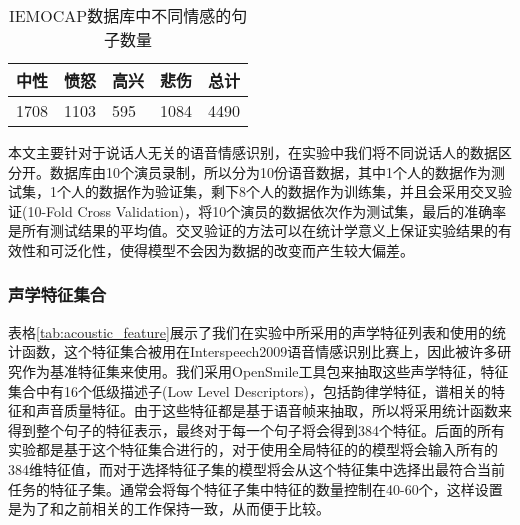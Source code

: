 \begin{table}[htb]
\centering
\begin{minipage}[t]{0.8\linewidth} %
\caption{IEMOCAP数据库中不同情感的句子数量}
\label{tab:emo_sample_num}
    \begin{tabularx}{\linewidth}{X<{\centering} X<{\centering} X<{\centering} X<{\centering} X<{\centering}}
        \toprule[1.5pt]
        中性 & 愤怒 & 高兴 & 悲伤 & 总计 \\
        \midrule[1pt]
        1708 & 1103 & 595 & 1084 & 4490 \\
        \bottomrule[1.5pt]
    \end{tabularx}
\end{minipage}
\end{table}

本文主要针对于说话人无关的语音情感识别，在实验中我们将不同说话人的数据区分开。数据库由10个演员录制，所以分为10份语音数据，其中1个人的数据作为测试集，1个人的数据作为验证集，剩下8个人的数据作为训练集，并且会采用交叉验证(10-Fold Cross Validation)，将10个演员的数据依次作为测试集，最后的准确率是所有测试结果的平均值。交叉验证的方法可以在统计学意义上保证实验结果的有效性和可泛化性，使得模型不会因为数据的改变而产生较大偏差。

\subsubsection{声学特征集合}
\label{sssec:acoustic_feature_set}

表格\ref{tab:acoustic_feature}展示了我们在实验中所采用的声学特征列表和使用的统计函数，这个特征集合被用在Interspeech2009语音情感识别比赛上，因此被许多研究作为基准特征集来使用。我们采用OpenSmile工具包来抽取这些声学特征，特征集合中有16个低级描述子(Low Level Descriptors)，包括韵律学特征，谱相关的特征和声音质量特征。由于这些特征都是基于语音帧来抽取，所以将采用统计函数来得到整个句子的特征表示，最终对于每一个句子将会得到384个特征。后面的所有实验都是基于这个特征集合进行的，对于使用全局特征的的模型将会输入所有的384维特征值，而对于选择特征子集的模型将会从这个特征集中选择出最符合当前任务的特征子集。通常会将每个特征子集中特征的数量控制在40-60个，这样设置是为了和之前相关的工作保持一致，从而便于比较。

